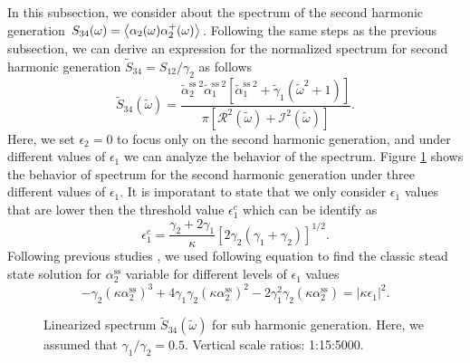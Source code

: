 \documentclass[fleqn,11pt]{wlscirep}
\begin{document}
In this subsection, we consider about the spectrum of the second harmonic generation $S_{34}(\omega) = \expval{\alpha_2(\omega)\alpha_2^+(\omega)}$.
Following the same steps as the previous subsection, we can derive an expression for the normalized spectrum for second harmonic generation  $\tilde{S}_{34} = S_{12}/\gamma_2$ as follows
\begin{equation}
	\tilde{S}_{34}(\tilde{\omega}) = 
	\frac{
		\tilde{\alpha}_2^{\text{ss}\;2}\tilde{\alpha}_1^{\text{ss}\;2}
		\left[\tilde{\alpha}_1^{\text{ss}\;2} + \tilde{\gamma}_1(\tilde{\omega}^2 + 1)\right]
	}{\pi \left[\mathcal{R}^2(\tilde{\omega}) + \mathcal{I}^2(\tilde{\omega})\right]}.
\end{equation}
Here, we set $\epsilon_2 =0$ to focus only on the second harmonic generation, and under different values of $\epsilon_1$ we can analyze the behavior of the spectrum. Figure \ref{fig_3} shows the behavior of spectrum for the second harmonic generation under three different values of $\epsilon_1$. It is imporatant to state that we only consider $\epsilon_1$ values that are lower then the threshold value $\epsilon_1^c$ which can be identify as \cite{mcneil1978} 
\begin{equation}
	\epsilon_1^c = \frac{\gamma_2 + 2\gamma_1}{\kappa}
	\left[ 2\gamma_2(\gamma_1 + \gamma_2)\right]^{1/2}.
\end{equation}
Following previous studies \cite{drummond1980n,mcneil1978}, we used following equation to find the classic stead state solution for ${\alpha}_2^{\text{ss}}$ variable for different levels of $\epsilon_1$ values 
\begin{equation}
	-\gamma_2(\kappa{\alpha}_2^{\text{ss}})^3 +
	4\gamma_1\gamma_2(\kappa{\alpha}_2^{\text{ss}})^2 -
	2\gamma_1^2\gamma_2(\kappa{\alpha}_2^{\text{ss}}) =
	|\kappa\epsilon_1|^2.
\end{equation}
\begin{figure}[!t]
	\centering
	\caption{Linearized spectrum $\tilde{S}_{34}(\tilde{\omega})$ for sub harmonic generation. Here, we assumed that $\gamma_1/\gamma_2 = 0.5$. Vertical scale ratios: 1:15:5000.}
	\label{fig_3}
\end{figure}
\end{document}
